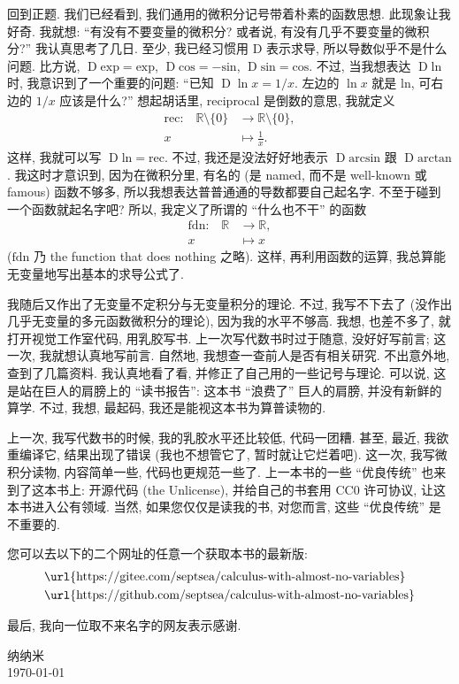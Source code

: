 回到正题. 我们已经看到, 我们通用的微积分记号带着朴素的函数思想. 此现象让我好奇. 我就想: ``有没有不要变量的微积分? 或者说, 有没有几乎不要变量的微积分?'' 我认真思考了几日. 至少, 我已经习惯用 $\mathrm{D}$ 表示求导, 所以导数似乎不是什么问题. 比方说, $\operatorname{D} \mathrm{exp} = \mathrm{exp}$, $\operatorname{D} \mathrm{cos} = -\mathrm{sin}$, $\operatorname{D} \mathrm{sin} = \mathrm{cos}$. 不过, 当我想表达 $\operatorname{D} \mathrm{ln}$ 时, 我意识到了一个重要的问题: ``已知 $\operatorname{D} \ln {x} = 1/x$. 左边的 $\ln {x}$ 就是 $\mathrm{ln}$, 可右边的 $1/x$ 应该是什么?'' 想起胡话里, reciprocal 是倒数的意思, 我就定义
\begin{align*}
    \text{$\mathrm{rec}$:} \quad
    \mathbb{R} \setminus \{ 0 \} & \to \mathbb{R} \setminus \{ 0 \}, \\
    x                            & \mapsto \frac{1}{x}.
\end{align*}
这样, 我就可以写 $\operatorname{D} \mathrm{ln} = \mathrm{rec}$. 不过, 我还是没法好好地表示 $\operatorname{D} \mathrm{arcsin}$ 跟 $\operatorname{D} \mathrm{arctan}$. 我这时才意识到, 因为在微积分里, 有名的 (是 named, 而不是 well-known 或 famous) 函数不够多, 所以我想表达普普通通的导数都要自己起名字. 不至于碰到一个函数就起名字吧? 所以, 我定义了所谓的 ``什么也不干'' 的函数
\begin{align*}
    \text{$\mathrm{fdn}$:} \quad
    \mathbb{R} & \to \mathbb{R}, \\
    x          & \mapsto x
\end{align*}
($\mathrm{fdn}$ 乃 the function that does nothing 之略). 这样, 再利用函数的运算, 我总算能无变量地写出基本的求导公式了.

我随后又作出了无变量不定积分与无变量积分的理论. 不过, 我写不下去了 (没作出几乎无变量的多元函数微积分的理论), 因为我的水平不够高. 我想, 也差不多了, 就打开视觉工作室代码, 用乳胶写书. 上一次写代数书时过于随意, 没好好写前言; 这一次, 我就想认真地写前言. 自然地, 我想查一查前人是否有相关研究. 不出意外地, 查到了几篇资料. 我认真地看了看, 并修正了自己用的一些记号与理论. 可以说, 这是站在巨人的肩膀上的 ``读书报告'': 这本书 ``浪费了'' 巨人的肩膀, 并没有新鲜的算学. 不过, 我想, 最起码, 我还是能视这本书为算普读物的.

上一次, 我写代数书的时候, 我的乳胶水平还比较低, 代码一团糟. 甚至, 最近, 我欲重编译它, 结果出现了错误 (我也不想管它了, 暂时就让它烂着吧). 这一次, 我写微积分读物, 内容简单一些, 代码也更规范一些了. 上一本书的一些 ``优良传统'' 也来到了这本书上: 开源代码 (the Unlicense), 并给自己的书套用 CC0 许可协议, 让这本书进入公有领域. 当然, 如果您仅仅是读我的书, 对您而言, 这些 ``优良传统'' 是不重要的.

您可以去以下的二个网址的任意一个获取本书的最新版:
\begin{align*}
     & \text{\url{https://gitee.com/septsea/calculus-with-almost-no-variables}}  \\
     & \text{\url{https://github.com/septsea/calculus-with-almost-no-variables}}
\end{align*}

最后, 我向一位取不来名字的网友表示感谢.

\begin{flushright}
    纳纳米\\
    \today
\end{flushright}
